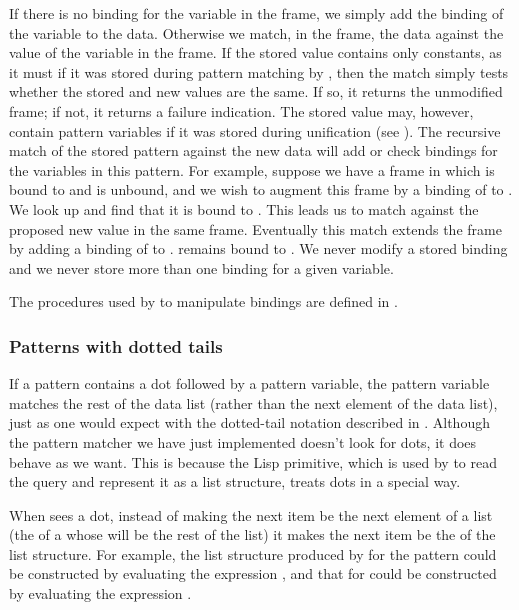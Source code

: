 \noindent
If there is no binding for the variable in the frame, we simply add the binding
of the variable to the data.  Otherwise we match, in the frame, the data
against the value of the variable in the frame.  If the stored value contains
only constants, as it must if it was stored during pattern matching by
, then the match simply tests whether the stored and
new values are the same.  If so, it returns the unmodified frame; if not, it
returns a failure indication.  The stored value may, however, contain pattern
variables if it was stored during unification (see ).  The
recursive match of the stored pattern against the new data will add or check
bindings for the variables in this pattern.  For example, suppose we have a
frame in which  is bound to  and  is unbound,
and we wish to augment this frame by a binding of  to .
We look up  and find that it is bound to .  This leads us
to match  against the proposed new value  in the same
frame.  Eventually this match extends the frame by adding a binding of
 to .   remains bound to .  We never
modify a stored binding and we never store more than one binding for a given
variable.

The procedures used by  to manipulate bindings are
defined in .

\subsubsection*{Patterns with dotted tails}

If a pattern contains a dot followed by a pattern variable, the pattern
variable matches the rest of the data list (rather than the next element of the
data list), just as one would expect with the dotted-tail notation described in
.  Although the pattern matcher we have just implemented
doesn't look for dots, it does behave as we want.  This is because the Lisp
 primitive, which is used by  to read the
query and represent it as a list structure, treats dots in a special way.

When  sees a dot, instead of making the next item be the next
element of a list (the  of a  whose  will be the
rest of the list) it makes the next item be the  of the list
structure.  For example, the list structure produced by  for the
pattern  could be constructed by evaluating the
expression , and that for
 could be constructed by evaluating the expression
.

